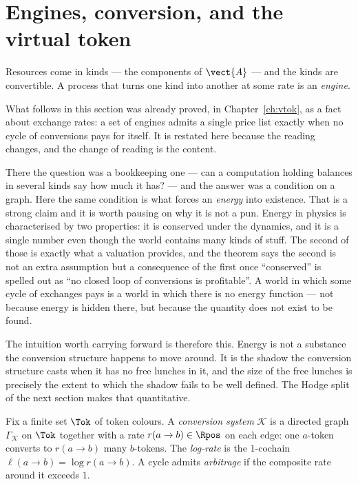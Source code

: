 \section{Engines, conversion, and the virtual token}

Resources come in kinds --- the components of $\vect{A}$ --- and the kinds
are convertible.  A process that turns one kind into another at some rate
is an \emph{engine}.

\begin{remark}
\label{rmk:vtok-twice}
What follows in this section was already proved, in
Chapter~\ref{ch:vtok}, as a fact about exchange rates: a set of engines
admits a single price list exactly when no cycle of conversions pays for
itself.
It is restated here because the reading changes, and the change of
reading is the content.

There the question was a bookkeeping one --- can a computation holding
balances in several kinds say how much it has? --- and the answer was a
condition on a graph.
Here the same condition is what forces an \emph{energy} into existence.
That is a strong claim and it is worth pausing on why it is not a pun.
Energy in physics is characterised by two properties: it is conserved
under the dynamics, and it is a single number even though the world
contains many kinds of stuff.
The second of those is exactly what a valuation provides, and the
theorem says the second is not an extra assumption but a consequence of
the first once ``conserved'' is spelled out as ``no closed loop of
conversions is profitable''.
A world in which some cycle of exchanges pays is a world in which there
is no energy function --- not because energy is hidden there, but
because the quantity does not exist to be found.

The intuition worth carrying forward is therefore this.
Energy is not a substance the conversion structure happens to move
around.
It is the shadow the conversion structure casts when it has no free
lunches in it, and the size of the free lunches is precisely the extent
to which the shadow fails to be well defined.
The Hodge split of the next section makes that quantitative.
\end{remark}

\begin{definition}
\label{def:conv}
Fix a finite set $\Tok$ of token colours.  A \emph{conversion system}
$\mathcal{K}$ is a directed graph $\Gamma_{\mathcal K}$ on $\Tok$ together
with a rate $r(a \to b) \in \Rpos$ on each edge: one $a$-token converts to
$r(a\to b)$ many $b$-tokens.  The \emph{log-rate} is the $1$-cochain
$\ell(a \to b) = \log r(a\to b)$.  A cycle admits \emph{arbitrage} if the
composite rate around it exceeds $1$.
\end{definition}

